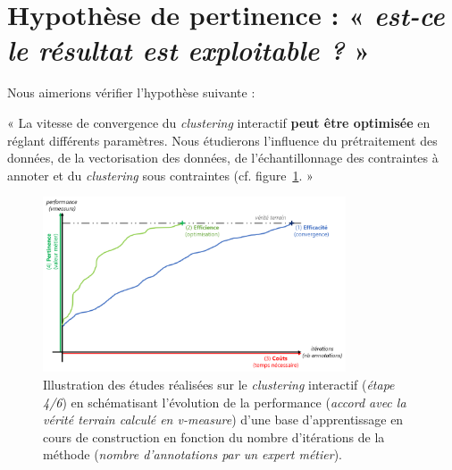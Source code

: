 \section{Hypothèse de pertinence : « \textit{est-ce le résultat est exploitable ?} »}
\label{section:4.4-HYPOTHESE-PERTINENCE}

	Nous aimerions vérifier l'hypothèse suivante :

	\begin{tcolorbox}[
		title=\faVial~\textbf{Hypothèse de pertinence}~\faVial,
		colback=colorTcolorboxHypothesis!15,  %
		colframe=colorTcolorboxHypothesis!75,  %
		width=\linewidth
	]
		« La vitesse de convergence du \textit{clustering} interactif \textbf{peut être optimisée} en réglant différents paramètres. Nous étudierons l'influence du prétraitement des données, de la vectorisation des données, de l'échantillonnage des contraintes à annoter et du \textit{clustering} sous contraintes (cf. figure~\ref{figure:4.4-HYPOTHESE-PERTINENCE}. »
		
		
		\begin{figure}[H]  %
			\centering
			\includegraphics[width=0.8\textwidth]{figures/hypotheses-04-pertinence}
			\caption{Illustration des études réalisées sur le \textit{clustering} interactif (\textit{étape 4/6}) en schématisant l'évolution de la performance (\textit{accord avec la vérité terrain calculé en v-measure}) d'une base d'apprentissage en cours de construction en fonction du nombre d'itérations de la méthode (\textit{nombre d'annotations par un expert métier}).}
			\label{figure:4.4-HYPOTHESE-PERTINENCE}
		\end{figure}

	\end{tcolorbox}
	
